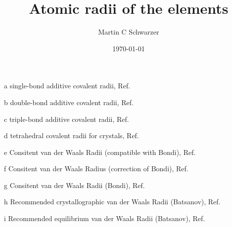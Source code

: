 \documentclass[   %
  final,          %
  a4paper,        %
  8pt
]{extarticle}
\title{Atomic radii of the elements}
\author{Martin C Schwarzer}
\date{\today}
\begin{document}
\begin{ThreePartTable}
  \begin{TableNotes}
  \footnotesize
\item [a] single-bond additive covalent radii, Ref.~\cite{Pyykkoe2009}
\item [b] double-bond additive covalent radii, Ref.~\cite{Pyykkoe2009a}
\item [c] triple-bond additive covalent radii, Ref.~\cite{Pyykkoe2005}
\item [d] tetrahedral covalent radii for crystals, Ref.~\cite{Pyykkoe2012}
\item [e] Consitent van der Waals Radii (compatible with Bondi), Ref.~\cite{Mantina2009} 
\item [f] Consitent van der Waals Radius (correction of Bondi), Ref.~\cite{Rowland1996}
\item [g] Consitent van der Waals Radii (Bondi), Ref.~\cite{Bondi1964}
\item [h] Recommended crystallographic van der Waals Radii (Batsanov), Ref.~\cite{Batsanov2001}
\item [i] Recommended equilibrium van der Waals Radii (Batsanov), Ref.~\cite{Batsanov2001}
  \end{TableNotes}


\end{ThreePartTable}
\end{document}
